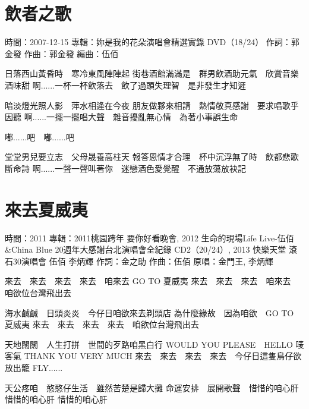 \documentclass[UTF8,a4paper,oneside,twocolumn,12pt]{ctexbook}
\newcommand{\infopair}[2]{\textbullet #1：#2}
\newcommand{\zc}[1][伍佰]{\infopair{作詞}{#1}}
\newcommand{\zq}[1][伍佰]{\infopair{作曲}{#1}}
\newcommand{\bq}[1][伍佰]{\infopair{編曲}{#1}}
\newcommand{\zj}[1]{\infopair{專輯}{#1}}
\newcommand{\yc}[1]{\infopair{原唱}{#1}}
\newcommand{\sj}[1]{\infopair{時間}{#1}}
\newenvironment{info}{\begin{flushleft}\kaishu
	}
	{\end{flushleft}\normalsize\yahei\par}
\newenvironment{lyric}{
	}
{}
\begin{document}
\section{飲者之歌}
\begin{info}
	\sj{2007-12-15}
	\zj{妳是我的花朵演唱會精選實錄 DVD（18/24）}
	\zc[郭金發]
	\zq[郭金發]
	\bq[伍佰]
\end{info}
\begin{lyric}
	日落西山黃昏時　寒冷東風陣陣起
	街巷酒館滿滿是　群男飲酒助元氣　欣賞音樂酒味甜
	啊......一杯一杯飲落去　飲了過頭失理智　是非發生才知遲

	暗淡燈光照人影　萍水相逄在今夜
	朋友做夥來相請　熱情敬真感謝　要求唱歌乎因聽
	啊......一擺一擺唱大聲　雜音擾亂無心情　為著小事誤生命

	嘟......吧　嘟......吧

	堂堂男兒要立志　父母晟養高柱天
	報答恩情才合理　杯中沉浮無了時　飲都悲歌斷命詩
	啊......一聲一聲叫著你　迷戀酒色愛覺醒　不通放蕩放袂記
\end{lyric}

\section{來去夏威夷} %
\begin{info}
	\sj{2011}
	\zj{2011桃園跨年 要你好看晚會, 2012 生命的現場Life Live-伍佰\&China Blue 20週年大感謝台北演唱會全紀錄 CD2（20/24）, 2013 快樂天堂 滾石30演唱會 伍佰 李炳輝}
	\zc[金之助] %
	\zq
	\yc{金門王, 李炳輝}
\end{info}
\begin{lyric}
	來去　來去　來去　來去　咱來去 GO TO 夏威夷
	來去　來去　來去　咱來去　咱欲位台灣飛出去

	海水鹹鹹　日頭炎炎　今仔日咱欲來去剃頭店
	為什麼緣故　因為咱欲　GO TO 夏威夷
	來去　來去　來去　來去　咱欲位台灣飛出去

	天地闊闊　人生打拼　世間的歹路咱黑白行
	WOULD YOU PLEASE　HELLO 唛客氣
	THANK YOU VERY MUCH
	來去　來去　來去　來去　今仔日這隻鳥仔欲放出籠
	FLY......

	天公疼咱　憨憨仔生活　雖然苦楚是歸大攤
	命運安排　展開歌聲　惜惜的咱心肝　惜惜的咱心肝 惜惜的咱心肝
\end{lyric}
\end{document}
